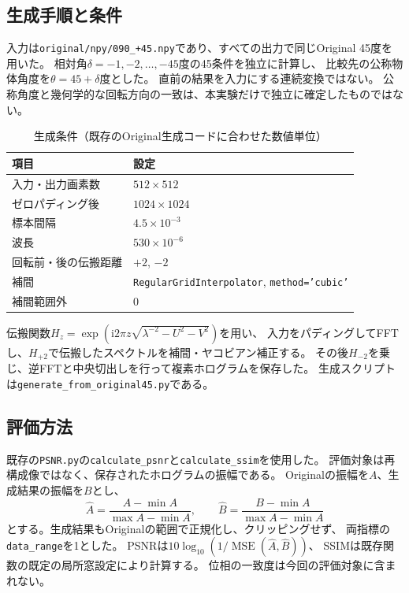 \documentclass[a4paper,10pt]{ltjsarticle}
\begin{document}
\subsection{生成手順と条件}
入力は\texttt{original/npy/090\_+45.npy}であり、すべての出力で同じOriginal 45度を用いた。
相対角$\delta=-1,-2,\ldots,-45$度の45条件を独立に計算し、
比較先の公称物体角度を$\theta=45+\delta$度とした。
直前の結果を入力にする連続変換ではない。
公称角度と幾何学的な回転方向の一致は、本実験だけで独立に確定したものではない。

\begin{table}[H]\centering
\caption{生成条件（既存のOriginal生成コードに合わせた数値単位）}
\begin{tabular}{ll}\toprule
項目&設定\\\midrule
入力・出力画素数&$512\times512$\\
ゼロパディング後&$1024\times1024$\\
標本間隔&$4.5\times10^{-3}$\\
波長&$530\times10^{-6}$\\
回転前・後の伝搬距離&$+2$, $-2$\\
補間&\texttt{RegularGridInterpolator}, \texttt{method='cubic'}\\
補間範囲外&0\\\bottomrule
\end{tabular}\end{table}
伝搬関数$H_z=\exp(\mathrm i2\pi z\sqrt{\lambda^{-2}-U^2-V^2})$を用い、
入力をパディングしてFFTし、$H_{+2}$で伝搬したスペクトルを補間・ヤコビアン補正する。
その後$H_{-2}$を乗じ、逆FFTと中央切出しを行って複素ホログラムを保存した。
生成スクリプトは\texttt{generate\_from\_original45.py}である。

\subsection{評価方法}
既存の\texttt{PSNR.py}の\texttt{calculate\_psnr}と\texttt{calculate\_ssim}を使用した。
評価対象は再構成像ではなく、保存されたホログラムの振幅である。
Originalの振幅を$A$、生成結果の振幅を$B$とし、
\begin{equation}
 \widehat A=\frac{A-\min A}{\max A-\min A},\qquad
 \widehat B=\frac{B-\min A}{\max A-\min A}
\end{equation}
とする。生成結果もOriginalの範囲で正規化し、クリッピングせず、
両指標の\texttt{data\_range}を1とした。
PSNRは$10\log_{10}(1/\operatorname{MSE}(\widehat A,\widehat B))$、
SSIMは既存関数の既定の局所窓設定により計算する。
位相の一致度は今回の評価対象に含まれない。
\end{document}
